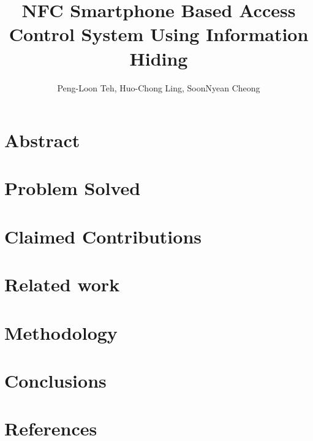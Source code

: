 \documentclass[•]{article}
\title{NFC Smartphone Based Access Control System Using Information Hiding}
\author{Peng-Loon Teh, Huo-Chong Ling, SoonNyean Cheong}
\date{}
\begin{document}
\tableofcontents
\maketitle

\section{Abstract}

\section{Problem Solved}

\section{Claimed Contributions}

\section{Related work}

\section{Methodology}

\section{Conclusions}

\section{References}
\end{document}
